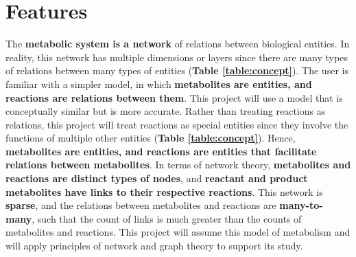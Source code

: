 

\section{Features}






The \textbf{metabolic system is a network} of relations between biological entities.
In reality, this network has multiple dimensions or layers \supercite{boccaletti_structure_2014, de_domenico_structural_2015} since there are many types of relations between many types of entities (\textbf{Table \ref{table:concept}}).
The user is familiar with a simpler model, in which \textbf{metabolites are entities, and reactions are relations between them}.
This project will use a model that is conceptually similar but is more accurate.
Rather than treating reactions as relations, this project will treat reactions as special entities since they involve the functions of multiple other entities (\textbf{Table \ref{table:concept}}).
Hence, \textbf{metabolites are entities, and reactions are entities that facilitate relations between metabolites}.
In terms of network theory, \textbf{metabolites and reactions are distinct types of nodes}, and \textbf{reactant and product metabolites have links to their respective reactions}.
This network is \textbf{sparse}, and the relations between metabolites and reactions are \textbf{many-to-many}, such that the count of links is much greater than the counts of metabolites and reactions.
This project will assume this model of metabolism and will apply principles of network and graph theory to support its study.

